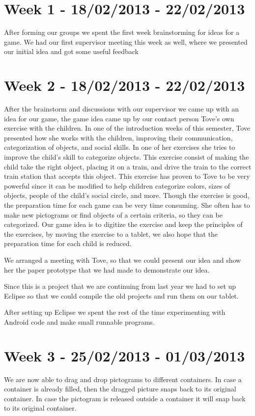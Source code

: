 \section*{Week 1 - 18/02/2013 - 22/02/2013}
After forming our groups we spent the first week brainstorming for ideas for a game. We had our first supervisor meeting this week as well, where we presented our initial idea and got some useful feedback

\section*{Week 2 - 18/02/2013 - 22/02/2013} 
\label{processweek2}
After the brainstorm and discussions with our supervisor we came up with an idea for our game, the game idea came up by our contact person Tove's own exercise with the children. In one of the introduction weeks of this semester, Tove presented how she works with the children, improving their communication, categorization of objects, and social skills. In one of her exercises she tries to improve the child's skill to categorize objects. This exercise consist of making the child take the right object, placing it on a train, and drive the train to the correct train station that accepts this object. This exercise has proven to Tove to be very powerful since it can be modified to help children categorize colors, sizes of objects, people of the child's social circle, and more. Though the exercise is good, the preparation time for each game can be very time consuming. She often has to make new pictograms or find objects of a certain criteria, so they can be categorized. Our game idea is to digitize the exercise and keep the principles of the exercises, by moving the exercise to a tablet, we also hope that the preparation time for each child is reduced.

We arranged a meeting with Tove, so that we could present our idea and show her the paper prototype that we had made to demonstrate our idea.%

Since this is a project that we are continuing from last year we had to set up Eclipse so that we could compile the old projects and run them on our tablet. 

After setting up Eclipse we spent the rest of the time experimenting with Android code and make small runnable programs. 

\section*{Week 3 - 25/02/2013 - 01/03/2013}
We are now able to drag and drop pictograms to different containers. In case a container is already filled, then the dragged picture snaps back to its original container. In case the pictogram is released outside a container it will snap back to its original container. 

